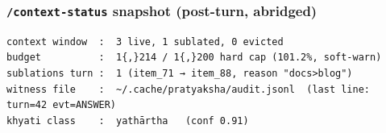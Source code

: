 \subsubsection{\texorpdfstring{\texttt{/context-status} snapshot (post-turn, abridged)}{/context-status snapshot (post-turn, abridged)}}\label{context-status-snapshot-post-turn-abridged}

\begin{lstlisting}
context window  :  3 live, 1 sublated, 0 evicted
budget          :  1{,}214 / 1{,}200 hard cap (101.2%, soft-warn)
sublations turn :  1 (item_71 → item_88, reason "docs>blog")
witness file    :  ~/.cache/pratyaksha/audit.jsonl  (last line: turn=42 evt=ANSWER)
khyati class    :  yathārtha   (conf 0.91)
\end{lstlisting}
